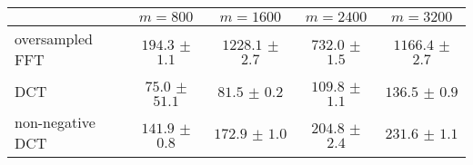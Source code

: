 \centering
\renewcommand{\arraystretch}{1.2}
\begin{tabular}{@{}lcccc@{}}
\toprule
 & $m=800$ & $m=1600$ & $m=2400$ & $m=3200$\\
\midrule
oversampled FFT & $194.3$ $\pm$ $1.1$ & $1228.1$ $\pm$ $2.7$ & $732.0$ $\pm$ $1.5$ & $1166.4$ $\pm$ $2.7$ \\
DCT & $75.0$ $\pm$ $51.1$ & $81.5$ $\pm$ $0.2$ & $109.8$ $\pm$ $1.1$ & $136.5$ $\pm$ $0.9$ \\
non-negative DCT & $141.9$ $\pm$ $0.8$ & $172.9$ $\pm$ $1.0$ & $204.8$ $\pm$ $2.4$ & $231.6$ $\pm$ $1.1$ \\
\bottomrule
\end{tabular}
